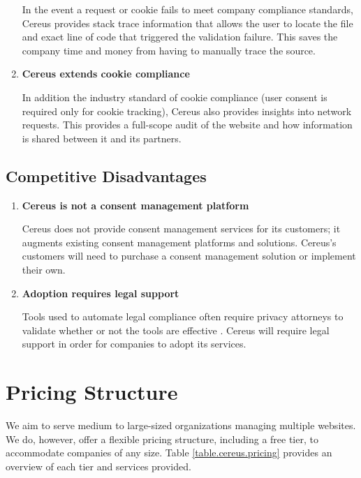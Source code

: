 \begin{enumerate}
  In the event a request or cookie fails to meet company compliance standards, Cereus provides stack trace information that allows the user to locate the file and exact line of code that triggered the validation failure. This saves the company time and money from having to manually trace the source.

  \item \textbf{Cereus extends cookie compliance}

  In addition the industry standard of cookie compliance (user consent is required only for cookie tracking), Cereus also provides insights into network requests. This provides a full-scope audit of the website and how information is shared between it and its partners.

\end{enumerate}

\subsection{Competitive Disadvantages}

\begin{enumerate}

  \item \textbf{Cereus is not a consent management platform}

  Cereus does not provide consent management services for its customers; it augments existing consent management platforms and solutions. Cereus's customers will need to purchase a consent management solution or implement their own.

  \item \textbf{Adoption requires legal support}

  Tools used to automate legal compliance often require privacy attorneys to validate whether or not the tools are effective \cite{bloomlaw.2019}. Cereus will require legal support in order for companies to adopt its services.

\end{enumerate}

\section{Pricing Structure}

We aim to serve medium to large-sized organizations managing multiple websites. We do, however, offer a flexible pricing structure, including a free tier, to accommodate companies of any size. Table \ref{table.cereus.pricing} provides an overview of each tier and services provided.

